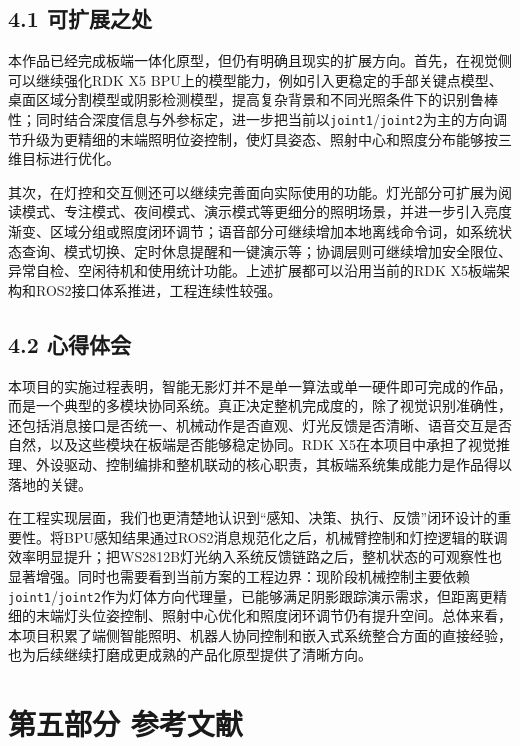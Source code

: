 \documentclass[UTF8,a4paper,zihao=-4]{ctexart}
\begin{document}
\subsection*{4.1 可扩展之处}

本作品已经完成板端一体化原型，但仍有明确且现实的扩展方向。首先，在视觉侧可以继续强化RDK X5 BPU上的模型能力，例如引入更稳定的手部关键点模型、桌面区域分割模型或阴影检测模型，提高复杂背景和不同光照条件下的识别鲁棒性；同时结合深度信息与外参标定，进一步把当前以\texttt{joint1}/\texttt{joint2}为主的方向调节升级为更精细的末端照明位姿控制，使灯具姿态、照射中心和照度分布能够按三维目标进行优化。

其次，在灯控和交互侧还可以继续完善面向实际使用的功能。灯光部分可扩展为阅读模式、专注模式、夜间模式、演示模式等更细分的照明场景，并进一步引入亮度渐变、区域分组或照度闭环调节；语音部分可继续增加本地离线命令词，如系统状态查询、模式切换、定时休息提醒和一键演示等；协调层则可继续增加安全限位、异常自检、空闲待机和使用统计功能。上述扩展都可以沿用当前的RDK X5板端架构和ROS2接口体系推进，工程连续性较强。

\subsection*{4.2 心得体会}

本项目的实施过程表明，智能无影灯并不是单一算法或单一硬件即可完成的作品，而是一个典型的多模块协同系统。真正决定整机完成度的，除了视觉识别准确性，还包括消息接口是否统一、机械动作是否直观、灯光反馈是否清晰、语音交互是否自然，以及这些模块在板端是否能够稳定协同。RDK X5在本项目中承担了视觉推理、外设驱动、控制编排和整机联动的核心职责，其板端系统集成能力是作品得以落地的关键。

在工程实现层面，我们也更清楚地认识到“感知、决策、执行、反馈”闭环设计的重要性。将BPU感知结果通过ROS2消息规范化之后，机械臂控制和灯控逻辑的联调效率明显提升；把WS2812B灯光纳入系统反馈链路之后，整机状态的可观察性也显著增强。同时也需要看到当前方案的工程边界：现阶段机械控制主要依赖\texttt{joint1}/\texttt{joint2}作为灯体方向代理量，已能够满足阴影跟踪演示需求，但距离更精细的末端灯头位姿控制、照射中心优化和照度闭环调节仍有提升空间。总体来看，本项目积累了端侧智能照明、机器人协同控制和嵌入式系统整合方面的直接经验，也为后续继续打磨成更成熟的产品化原型提供了清晰方向。

\section*{第五部分 参考文献}
\end{document}
